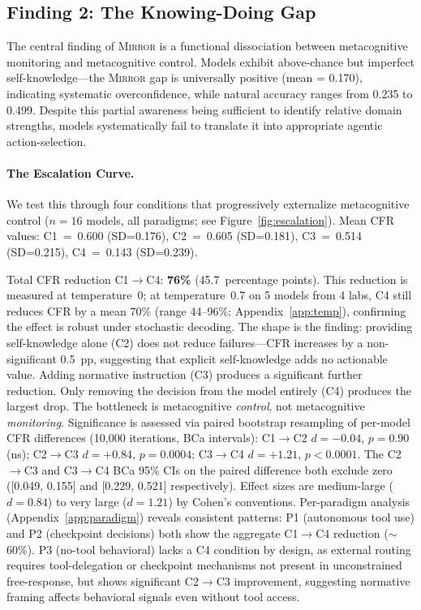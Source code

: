 \documentclass[10pt]{article}
\newcommand{\mirror}{\textsc{Mirror}}
\newcommand{\CFR}{CFR}
\begin{document}
\subsection{Finding 2: The Knowing-Doing Gap}

The central finding of \mirror{} is a functional dissociation between metacognitive
monitoring and metacognitive control. Models exhibit above-chance but imperfect self-knowledge---the \mirror{} gap is
universally positive (mean = 0.170), indicating systematic overconfidence, while
natural accuracy ranges from 0.235 to 0.499. Despite this partial awareness being
sufficient to identify relative domain strengths, models systematically fail to
translate it into appropriate agentic action-selection.

\paragraph{The Escalation Curve.}
We test this through four conditions that progressively externalize metacognitive
control ($n = 16$ models, all paradigms; see Figure~\ref{fig:escalation}).
Mean \CFR{} values: C1~=~0.600 (SD=0.176), C2~=~0.605 (SD=0.181), C3~=~0.514 (SD=0.215), C4~=~0.143 (SD=0.239).

Total \CFR{} reduction C1$\to$C4: \textbf{76\%} (45.7~percentage points).
This reduction is measured at temperature~0; at temperature~0.7 on 5 models from 4 labs, C4
still reduces CFR by a mean 70\% (range 44--96\%;
Appendix~\ref{app:temp}), confirming the effect is robust under stochastic decoding. The
shape is the finding: providing self-knowledge alone (C2) does not reduce failures---\CFR{}
increases by a non-significant 0.5~pp, suggesting that explicit
self-knowledge adds no actionable value. Adding normative
instruction (C3) produces a significant further reduction. Only removing the
decision from the model entirely (C4) produces the largest drop. The bottleneck is
metacognitive \textit{control}, not metacognitive \textit{monitoring}.
Significance is assessed via paired bootstrap resampling of per-model \CFR{} differences (10{,}000 iterations, BCa intervals): C1$\to$C2 $d = -0.04$, $p = 0.90$ (ns); C2$\to$C3 $d = +0.84$, $p = 0.0004$; C3$\to$C4 $d = +1.21$, $p < 0.0001$. The C2$\to$C3 and C3$\to$C4 BCa 95\% CIs on the paired difference both exclude zero ([0.049, 0.155] and [0.229, 0.521] respectively). Effect sizes are medium-large ($d\!=\!0.84$) to very large ($d\!=\!1.21$) by Cohen's conventions.
Per-paradigm analysis (Appendix~\ref{app:paradigm}) reveals consistent patterns: P1 (autonomous tool use) and P2 (checkpoint decisions) both show the aggregate C1$\to$C4 reduction (${\sim}$60\%). P3 (no-tool behavioral) lacks a C4 condition by design, as external routing requires tool-delegation or checkpoint mechanisms not present in unconstrained free-response, but shows significant C2$\to$C3 improvement, suggesting normative framing affects behavioral signals even without tool access.
\end{document}
